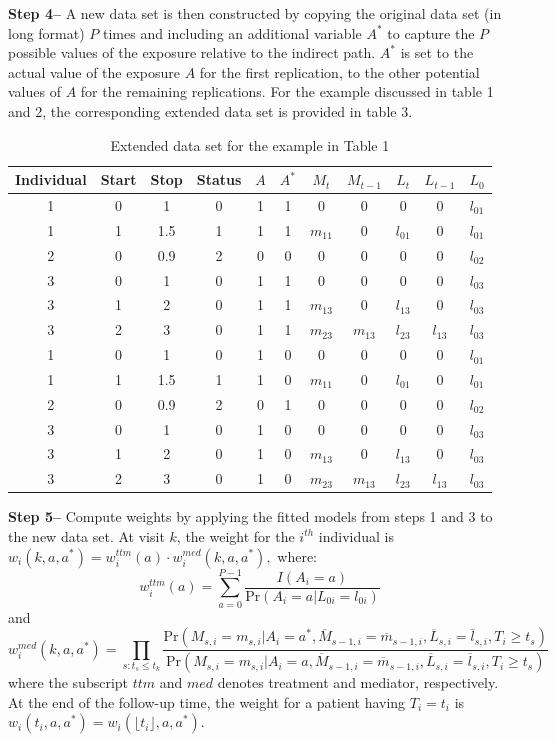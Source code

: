 \documentclass[AMA,STIX1COL]{WileyNJD-v2}
\newcommand{\pr}{\text{Pr}}
\begin{document}
\textbf{Step 4--}  A new data set is then constructed by copying the original data set (in long format) $P$ times and including an additional variable $A^*$ to capture the $P$ possible values of the exposure relative to the indirect path. $A^*$ is set to the actual value of the exposure $A$ for the first replication, to the other potential values of $A$ for the remaining replications. For the example discussed in table 1 and 2, the corresponding extended data set is provided in table 3.
\begin{table}
\centering
\caption{ Extended data set for the example in Table 1} 
\label{tab:ma}
\begin{tabular}{c c c c c c c c c c c}
\hline
   Individual & Start & Stop & Status & $A$ & $A^*$ & $M_t$ & $M_{t-1}$ & $L_t$ & $L_{t-1}$ & $L_0$\\ 
\hline
1 & 0 & 1    & 0 & 1 & 1 & 0   & 0     & 0     & 0    & $l_{01}$\\
1 & 1 & 1.5 & 1 & 1 & 1 &  $m_{11}$ & 0     & $l_{01}$ & 0 & $l_{01}$ \\
2 & 0 & 0.9 & 2 & 0 & 0 &  0    & 0     & 0     & 0    & $l_{02}$\\
3 & 0 &    1 & 0 & 1 & 1 &  0    & 0     & 0     & 0    & $l_{03}$\\
3 & 1 &    2 & 0 & 1 & 1 &  $m_{13}$ & 0 & $l_{13}$  & 0 & $l_{03}$ \\
3 & 2 &    3 & 0 & 1 & 1 & $m_{23}$ & $m_{13}$ & $l_{23}$ & $l_{13}$  & $l_{03}$\\
\hline
1 & 0 & 1    & 0 & 1 & 0 & 0   & 0     & 0     & 0    & $l_{01}$\\
1 & 1 & 1.5 & 1 & 1 & 0 &  $m_{11}$ & 0     & $l_{01}$ & 0 & $l_{01}$ \\
2 & 0 & 0.9 & 2 & 0 & 1 &  0    & 0     & 0     & 0    & $l_{02}$\\
3 & 0 &    1 & 0 & 1 & 0 &  0    & 0     & 0     & 0    & $l_{03}$\\
3 & 1 &    2 & 0 & 1 & 0 &  $m_{13}$ & 0 & $l_{13}$  & 0 & $l_{03}$ \\
3 & 2 &    3 & 0 & 1 & 0 & $m_{23}$ & $m_{13}$ & $l_{23}$ & $l_{13}$  & $l_{03}$\\
\hline
\end{tabular}
\end{table}

\textbf{Step 5--}  Compute weights by applying the fitted models from steps 1 and 3 to the new data set. At visit $k$, the weight for the $i^{th}$ individual is $w_{i}(k, a,a^*) = w_{i}^{ttm}(a)\cdot w_{i}^{med}(k,a,a^*),$ where:
\[w_i^{ttm}(a) = \sum_{a = 0}^{P-1} \frac{I(A_i = a)}{\pr(A_i = a|L_{0i} = l_{0i})}\]
and
\[w_{i}^{med}(k,a,a^*) = \prod_{s: t_s \le t_k} \frac{\pr(M_{s,i} = m_{s,i}|A_i = a^*, \overline{M}_{s - 1,i} = \overline{m}_{s - 1,i}, \overline{L}_{s,i} = \bar{l}_{s,i}, T_i\ge t_s)}{\pr(M_{s,i} = m_{s,i}|A_i = a, \overline{M}_{s - 1,i} = \overline{m}_{s - 1,i}, \overline{L}_{s,i} =\overline{l}_{s,i}, T_i\ge t_s)}\]
where the subscript $ttm$ and $med$ denotes treatment and mediator, respectively. At the end of the follow-up time, the weight for a patient having $T_i = t_i$ is $w_{i}(t_i, a,a^*) = w_{i}(\lfloor t_i \rfloor ,a,a^*)$. 
\end{document}
